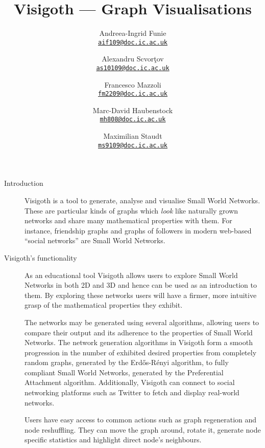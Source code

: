 \documentclass[a4paper,11pt]{article}
\let\stdhref\href
\renewcommand{\href}[2]{\stdhref{#1}{\texttt{#2}}}
\newcommand{\mailto}[1]{\href{mailto:#1}{#1}}
\begin{document}
\title{Visigoth --- Graph Visualisations}
\author{
  Andreea-Ingrid Funie\\\mailto{aif109@doc.ic.ac.uk}\and
  Alexandru Scvor\c tov\\\mailto{as10109@doc.ic.ac.uk}\and
  Francesco Mazzoli\\\mailto{fm2209@doc.ic.ac.uk}\and
  Marc-David Haubenstock\\\mailto{mh808@doc.ic.ac.uk}\and
  Maximilian Staudt\\\mailto{ms9109@doc.ic.ac.uk}
}
\date{}
\maketitle

\begin{description}
\item[Introduction]

  Visigoth is a tool to generate, analyse and visualise Small World
  Networks. These are particular kinds of graphs which \emph{look}
  like naturally grown networks and share many mathematical properties
  with them.  For instance, friendship graphs and graphs of followers
  in modern web-based ``social networks'' are Small World Networks.

  \item[Visigoth's functionality]

  As an educational tool Visigoth allows users to explore Small World
  Networks in both 2D and 3D and hence can be used as an introduction
  to them. By exploring these networks users will have a firmer, more
  intuitive grasp of the mathematical properties they exhibit.

  The networks may be generated using several algorithms, allowing
  users to compare their output and its adherence to the properties of
  Small World Networks. The network generation algorithms in Visigoth
  form a smooth progression in the number of exhibited desired
  properties from completely random graphs, generated by the
  Erd\H{o}s-R\'{e}nyi algorithm, to fully compliant Small World
  Networks, generated by the Preferential Attachment
  algorithm. Additionally, Visigoth can connect to social networking
  platforms such as Twitter to fetch and display real-world networks.

  Users have easy access to common actions such as graph regeneration
  and node reshuffling. They can move the graph around, rotate it,
  generate node specific statistics and highlight direct node's
  neighbours.


\end{description}
\end{document}
